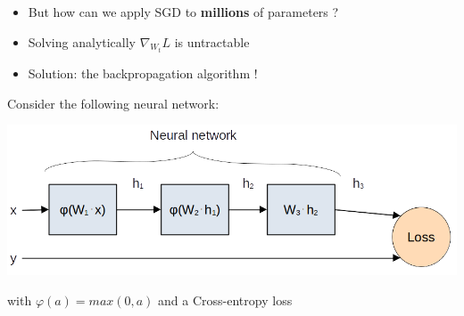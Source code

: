 \documentclass[usenames,dvipsnames]{beamer}
\begin{document}
	\begin{frame}{\secname}{\subsecname}
	    \begin{itemize}
	        \item But how can we apply SGD to \textbf{millions} of parameters ?
	        \item Solving analytically $\nabla_{W_t}L$ is untractable
	        \item Solution: the \alert{backpropagation} algorithm !
	    \end{itemize}
	    \begin{example}
	        Consider the following neural network:
	        \begin{center}
				\includegraphics[width=0.8\linewidth]{figures/DL_fundamentals/backpropagation_mik.png}
			\end{center}
			\vspace{-0.7em}
			with $\varphi(a) = max(0, a)$ and a Cross-entropy loss
	    \end{example}
    \end{frame}
\end{document}
